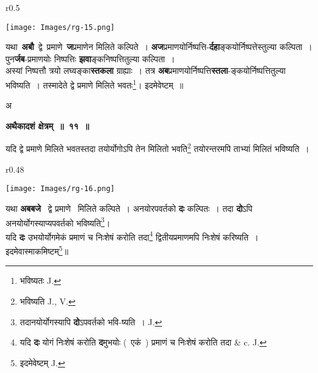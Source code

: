 \documentclass[11pt, openany]{book}
\begin{document}
\begin{wrapfigure}{r}{0.5\textwidth}
\vspace{-10mm}
\begin{center}
\texttt{[image: Images/rg-15.png]}
\end{center}
\vspace{-8mm}
\end{wrapfigure}

 यथा \,\textbf{अबौ} \,द्वे \,प्रमाणे \,\textbf{ज}प्रमाणेन मिलिते कल्पिते~। \textbf{अज}प्रमाणयोर्निष्पत्ति-\textbf{र्दहा}ङ्कयोर्निष्पत्तेस्तुल्या कल्पिता~। पुन\textbf{र्जब}-प्रमाणयोः निष्पत्तिः \textbf{झवा}ङ्कनिष्पत्तितुल्या कल्पिता~।\\
 
  अस्यां निष्पत्तौ त्रयो लघ्वङ्का\textbf{स्तकला} ग्राह्याः~। तत्र \textbf{अब}प्रमाणयोर्निष्पत्ति\textbf{स्तला}-ङ्कयोर्निष्पत्तितुल्या भविष्यति~। तस्मादेते द्वे प्रमाणे मिलिते भवतः\renewcommand{\thefootnote}{७}\footnote{भविष्यतः {\en J.}}\;। इदमेवेष्टम्~॥ \\
\vspace{10mm}

{\color{white}अ} 
\newpage

\begin{center}
\textbf{\large अथैकादशं क्षेत्रम्~॥~११~॥}
\end{center}

{\ab  यदि द्वे प्रमाणे मिलिते भवतस्तदा तयोर्योगोऽपि तेन मिलितो भवति\renewcommand{\thefootnote}{१}\footnote{भविष्यति {\en J., V.}} तयोरन्तरमपि ताभ्यां मिलितं भविष्यति~। }\\

\begin{wrapfigure}{r}{0.48\textwidth}
\vspace{-6mm}
\begin{center}
\texttt{[image: Images/rg-16.png]}
\end{center}
\vspace{-8mm}
\end{wrapfigure}

 यथा \;\textbf{अबबजे} ~द्वे \;प्रमाणे ~मिलिते कल्पिते~। अनयोरपवर्तको \textbf{दः} कल्पितः~। तदा \textbf{दो}ऽपि अनयोर्योगस्याप्यपवर्तको भविष्यति\renewcommand{\thefootnote}{२}\footnote{तदानयोर्योगस्यापि \textbf{दो}ऽपवर्तको भवि-ष्यति~। {\en J.}}\;। \\

 यदि \textbf{दः} उभयोर्योगमेकं प्रमाणं च निःशेषं करोति तदा\renewcommand{\thefootnote}{३}\footnote{यदि \textbf{दः} योगं निःशेषं करोति \textbf{द}मुभयोः (~एकं~) प्रमाणं च निःशेषं करोति तदा {\en \& c. J.}} द्वितीयप्रमाणमपि निःशेषं करिष्यति~। इदमेवास्माकमिष्टम्\renewcommand{\thefootnote}{४}\footnote{इदमेवेष्टम् {\en J.}
}\;॥ 
\vspace{2mm}
\end{document}
